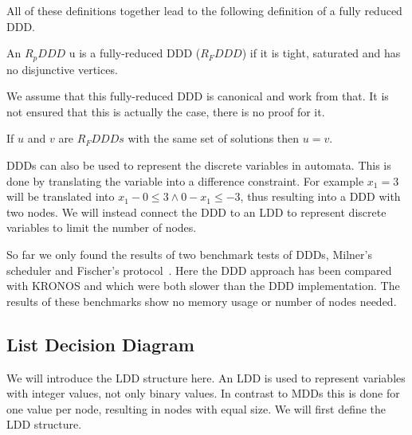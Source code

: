 All of these definitions together lead to the following definition of a fully reduced DDD.
 
\begin{mydef}
\label{def:RFDDD}
An $R_pDDD$ u is a fully-reduced DDD ($R_FDDD$) if it is tight, saturated and has no disjunctive vertices.
\end{mydef}

We assume that this fully-reduced DDD is canonical and work from that. It is not ensured that this is actually the case, there is no proof for it.

\begin{myconjecture}
\label{def:Canonical-ddd}
If $u$ and $v$ are $R_FDDDs$ with the same set of solutions then $u = v$.
\end{myconjecture}


DDDs can also be used to represent the discrete variables in automata. This is done by translating the variable into a difference constraint. For example $x_1 = 3$ will be translated into $x_1 - 0 \leq 3 \wedge 0 - x_1 \leq -3$, thus resulting into a DDD with two nodes. We will instead connect the DDD to an LDD to represent discrete variables to limit the number of nodes.

So far we only found the results of two benchmark tests of DDDs, Milner's scheduler and Fischer's protocol~\cite{Møller200253}. Here the DDD approach has been compared with KRONOS and \uppaal{} which were both slower than the DDD implementation. The results of these benchmarks show no memory usage or number of nodes needed.

\subsection{List Decision Diagram}
We will introduce the LDD structure here. An LDD is used to represent variables with integer values, not only binary values. In contrast to MDDs this is done for one value per node, resulting in nodes with equal size. We will first define the LDD structure.


